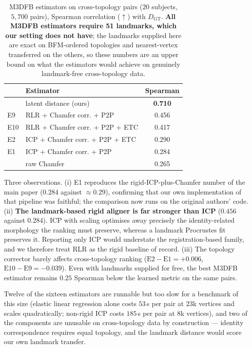 \documentclass{article}
\begin{document}
\begin{table}[!ht]
\centering
\small
\caption{M3DFB estimators on cross-topology pairs ($20$ subjects, $5{,}700$ pairs),
Spearman correlation ($\uparrow$) with $D_{\mathrm{GT}}$. \textbf{All M3DFB estimators
require 51 landmarks, which our setting does not have}; the landmarks supplied here are
exact on BFM-ordered topologies and nearest-vertex transferred on the others, so these
numbers are an upper bound on what the estimators would achieve on genuinely
landmark-free cross-topology data.}
\label{tab:supp_m3dfb}
\begin{tabular}{llc}
\toprule
& Estimator & Spearman \\
\midrule
& latent distance (ours) & \textbf{0.710} \\
\midrule
E9  & RLR + Chamfer corr. + P2P        & 0.456 \\
E10 & RLR + Chamfer corr. + P2P + ETC  & 0.417 \\
E2  & ICP + Chamfer corr. + P2P + ETC  & 0.290 \\
E1  & ICP + Chamfer corr. + P2P        & 0.284 \\
& raw Chamfer                          & 0.265 \\
\bottomrule
\end{tabular}
\end{table}

Three observations. (i) E1 reproduces the rigid-ICP-plus-Chamfer number of the main
paper ($0.284$ against $\approx0.29$), confirming that our own implementation of that
pipeline was faithful; the comparison now runs on the original authors' code.
(ii) \textbf{The landmark-based rigid aligner is far stronger than ICP} ($0.456$ against
$0.284$). ICP with scaling optimises away precisely the identity-related morphology the
ranking must preserve, whereas a landmark Procrustes fit preserves it. Reporting only
ICP would understate the registration-based family, and we therefore treat RLR as the
rigid baseline of record. (iii) The topology corrector barely affects cross-topology
ranking ($\mathrm{E2}-\mathrm{E1} = +0.006$, $\mathrm{E10}-\mathrm{E9} = -0.039$).
Even with landmarks supplied for free, the best M3DFB estimator remains $0.25$ Spearman
below the learned metric on the same pairs.

Twelve of the sixteen estimators are runnable but too slow for a benchmark of this size
(elastic linear regression alone costs $53$\,s per pair at $23$k vertices and scales
quadratically; non-rigid ICP costs $185$\,s per pair at $8$k vertices), and two of the
components are unusable on cross-topology data by construction --- identity
correspondence requires equal topology, and the landmark distance would score our own
landmark transfer.
\end{document}
